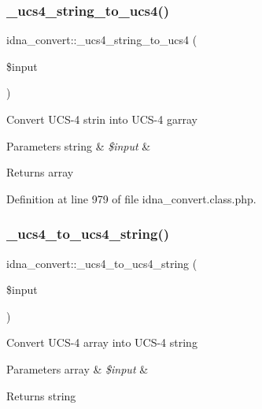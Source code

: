 \subsubsection{\texorpdfstring{\+\_\+ucs4\+\_\+string\+\_\+to\+\_\+ucs4()}{\_ucs4\_string\_to\_ucs4()}}
{\footnotesize\ttfamily idna\+\_\+convert\+::\+\_\+ucs4\+\_\+string\+\_\+to\+\_\+ucs4 (\begin{DoxyParamCaption}\item[{}]{\$input }\end{DoxyParamCaption})\hspace{0.3cm}{\ttfamily [protected]}}

Convert U\+C\+S-\/4 strin into U\+C\+S-\/4 garray


\begin{DoxyParams}[1]{Parameters}
string & {\em \$input} & \\
\hline
\end{DoxyParams}
\begin{DoxyReturn}{Returns}
array 
\end{DoxyReturn}


Definition at line 979 of file idna\+\_\+convert.\+class.\+php.

\mbox{\label{classidna__convert_ac353a6fccbc4e8e15e90772acb6e2a74}} 
\subsubsection{\texorpdfstring{\+\_\+ucs4\+\_\+to\+\_\+ucs4\+\_\+string()}{\_ucs4\_to\_ucs4\_string()}}
{\footnotesize\ttfamily idna\+\_\+convert\+::\+\_\+ucs4\+\_\+to\+\_\+ucs4\+\_\+string (\begin{DoxyParamCaption}\item[{}]{\$input }\end{DoxyParamCaption})\hspace{0.3cm}{\ttfamily [protected]}}

Convert U\+C\+S-\/4 array into U\+C\+S-\/4 string


\begin{DoxyParams}[1]{Parameters}
array & {\em \$input} & \\
\hline
\end{DoxyParams}
\begin{DoxyReturn}{Returns}
string 
\end{DoxyReturn}


